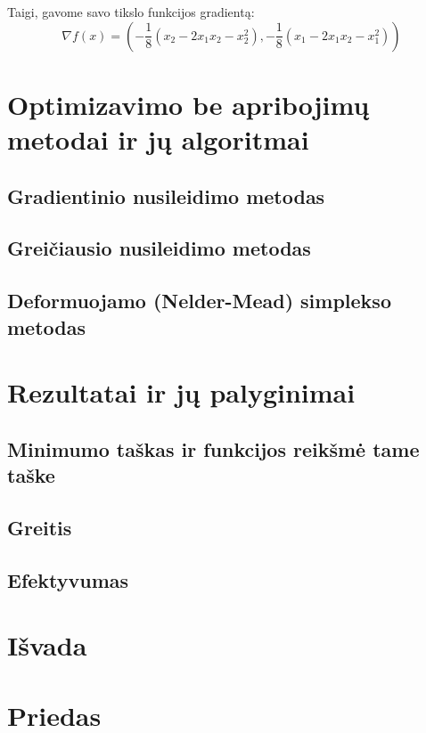 \documentclass{article}
\begin{document}
Taigi, gavome savo tikslo funkcijos gradientą:
\begin{equation}\label{eq:3}
    \nabla f(x) = (-\frac{1}{8}(x_{2}-2x_{1}x_{2}-x_{2}^2), -\frac{1}{8}(x_{1}-2x_{1}x_{2}-x_{1}^2))
\end{equation}
\section{Optimizavimo be apribojimų metodai ir jų algoritmai}
\subsection{Gradientinio nusileidimo metodas}
\subsection{Greičiausio nusileidimo metodas}
\subsection{Deformuojamo (Nelder-Mead) simplekso metodas}
\section{Rezultatai ir jų palyginimai}
\subsection{Minimumo taškas ir funkcijos reikšmė tame taške}
\subsection{Greitis}
\subsection{Efektyvumas}
\section{Išvada}
\section{Priedas}
\end{document}
